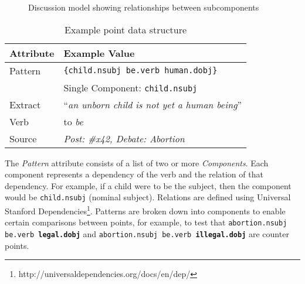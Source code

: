     \begin{figure}
      \centering
      \caption{Discussion model showing relationships between subcomponents}

      \label{fig:discmod}
    \end{figure}

    \begin{table}[]
      \centering
      \caption{Example point data structure}
      \label{tab:point-keyval}
      \begin{tabular}{|l|l|}
        \hline
        \textbf{Attribute}       & \textbf{Example Value}                         \\ \hline
        Pattern                  & \texttt{\{child.nsubj be.verb human.dobj\}} \\
                                 & Single Component: \texttt{child.nsubj}         \\ \hline
        Extract                  & ``\textit{an unborn child is not yet a human being}''               \\ \hline
        Verb                     & to \textit{be}                               \\ \hline
        Source                   & \textit{Post: \#x42, Debate: Abortion}          \\ \hline
      \end{tabular}
    \end{table}

    The \textit{Pattern} attribute consists of a list of two or more \textit{Components}. Each component represents a dependency of the verb and the relation of that dependency. For example, if a child were to be the subject, then the component would be \texttt{child.nsubj} (nominal subject). Relations are defined using Universal Stanford Dependencies\footnote{http://universaldependencies.org/docs/en/dep/}. Patterns are broken down into components to enable certain comparisons between points, for example, to test that \texttt{abortion.nsubj be.verb \textbf{legal.dobj}} and \texttt{abortion.nsubj be.verb \textbf{illegal.dobj}} are counter points.

